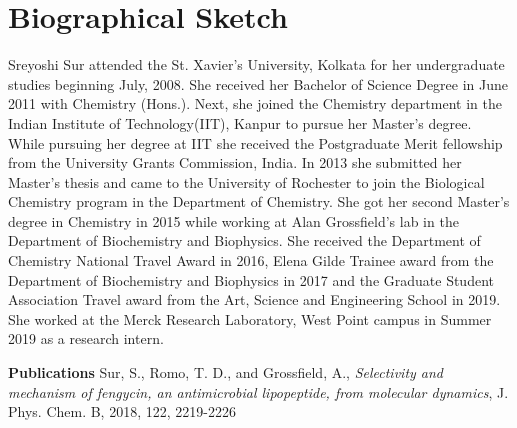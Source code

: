 \section*{Biographical Sketch}

Sreyoshi Sur attended the St. Xavier's University, Kolkata for her undergraduate 
studies beginning July, 2008. She received her Bachelor of Science Degree in June 
2011 with Chemistry (Hons.). Next, she joined the Chemistry department in the Indian 
Institute of Technology(IIT), Kanpur to pursue her Master's degree. While pursuing 
her degree at IIT she received the Postgraduate Merit fellowship from the University 
Grants Commission, India. In 2013 she submitted her Master's thesis and came to the 
University of Rochester to join the Biological Chemistry program in the Department of
Chemistry. She got her second Master's degree in Chemistry in 2015 while working at Alan Grossfield's lab in the Department of Biochemistry and Biophysics. She received the Department of Chemistry National Travel Award in 2016, Elena Gilde Trainee award from the Department of Biochemistry and Biophysics in 2017 and the Graduate Student Association Travel award from the Art, Science and Engineering School in 2019. She worked at the Merck Research Laboratory, West Point campus in Summer 2019 as a research intern.

\noindent \textbf{Publications}
Sur, S., Romo, T. D., and Grossfield, A., 
\emph{Selectivity and mechanism of fengycin, an antimicrobial lipopeptide, from molecular dynamics}, J. Phys. Chem. B, 2018, 122, 2219-2226\\

\newpage